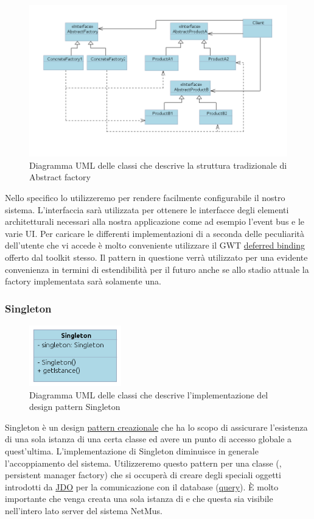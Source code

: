 \begin{figure}[h]
\centering
\includegraphics[width=16.5cm]{img/ST/AbstractFactory.png}
\caption{Diagramma UML delle classi che descrive la struttura tradizionale di
Abstract factory}
\end{figure}
Nello specifico lo utilizzeremo per rendere facilmente configurabile il nostro
sistema. L'interfaccia  sar\`a utilizzata per ottenere le
interfacce degli elementi architetturali necessari alla nostra applicazione come
ad esempio l'event bus e le varie UI.
Per caricare le differenti implementazioni di  a seconda delle
peculiarit\`a dell'utente che vi accede \`e molto conveniente utilizzare il GWT
\underline{deferred binding} offerto dal toolkit stesso.
Il pattern in questione verr\`a utilizzato per una evidente convenienza in termini
di estendibilit\`a per il futuro anche se allo stadio attuale la factory
implementata sar\`a solamente una.

\newpage
\subsubsection{Singleton}
\begin{figure}[h]
\centering
\includegraphics[width=4cm]{img/ST/Singleton.png}
\caption{Diagramma UML delle classi che descrive l'implementazione del design
pattern Singleton}
\end{figure}
Singleton \`e un design \underline{pattern creazionale} che ha lo scopo di
assicurare l'esistenza di una sola istanza di una certa classe ed avere un punto di accesso
globale a quest'ultima. 
L'implementazione di Singleton diminuisce in generale l'accoppiamento del
sistema.
Utilizzeremo questo pattern per una classe (, persistent manager
factory) che si occuper\`a di creare degli speciali oggetti introdotti da \underline{JDO} per la
comunicazione con il database (\underline{query}). \`E molto importante che venga creata una
sola istanza di  e che questa sia visibile nell'intero lato server del
sistema NetMus.

